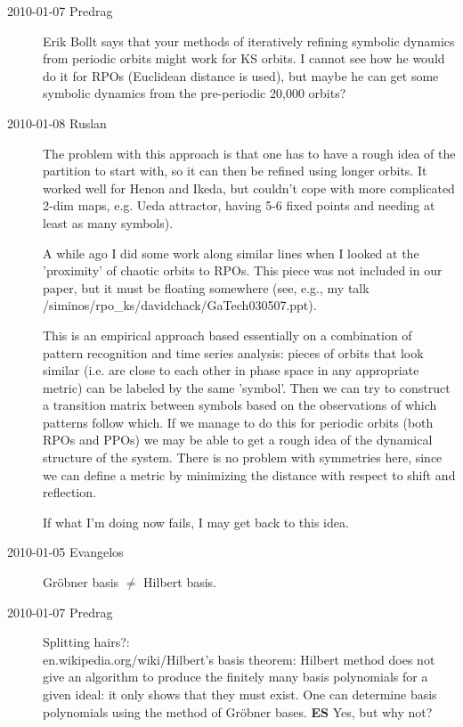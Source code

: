 \begin{description}
\item[2010-01-07 Predrag]
Erik Bollt says that your methods of iteratively refining
symbolic dynamics from periodic orbits might work for KS
orbits. I cannot see how he would do it for RPOs (Euclidean
distance is used), but maybe he can get some symbolic
dynamics from the pre-periodic 20,000 orbits?

\item[2010-01-08 Ruslan]
The problem with this approach is that one has to have a
rough idea of the partition to start with, so it can then be
refined using longer orbits.  It worked well for Henon and
Ikeda, but couldn't cope with more complicated 2-dim maps,
e.g. Ueda attractor, having 5-6 fixed points and needing at
least as many symbols).

A while ago I did some work along similar lines when I looked
at the 'proximity' of chaotic orbits to RPOs.  This piece was
not included in our paper, but it must be floating somewhere
(see, e.g., my talk
/siminos/rpo\_ks/davidchack/GaTech030507.ppt).

This is an empirical approach based essentially on a
combination of pattern recognition and time series analysis:
pieces of orbits that look similar (i.e. are close to each
other in phase space in any appropriate metric) can be
labeled by the same 'symbol'.  Then we can try to construct
a transition matrix between symbols based on the observations
of which patterns follow which.  If we manage to do this for
periodic orbits (both RPOs and PPOs) we may be able to get a
rough idea of the dynamical structure of the system.
There is no problem with symmetries here, since we can define
a metric by minimizing the distance with respect to shift and
reflection.

If what I'm doing now fails, I may get back to this idea.

\item[2010-01-05 Evangelos]
Gr\"obner basis $\neq$ Hilbert basis.

\item[2010-01-07 Predrag] Splitting hairs?:
\\\-
{en.wikipedia.org/wiki/Hilbert's basis theorem}:
Hilbert method does not give an algorithm
to produce the finitely many basis polynomials for a given
ideal: it only shows that they must exist. One can determine
basis polynomials using the method of Gr\"obner bases.
{\bf ES} Yes, but why not?


\end{description}
